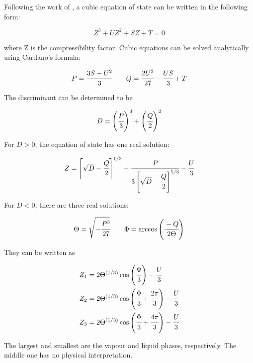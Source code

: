 \documentclass[../Article_Model_Parameters.tex]{subfiles}
\begin{document}
	
	Following the work of \citet{Gmehling2019}, a cubic equation of state can be written in the following form:
	
	{\footnotesize
		\begin{equation}
			Z^3 + UZ^2+ SZ + T = 0
		\end{equation}
	}

	where Z is the compressibility factor. Cubic equations can be solved analytically using Cardano's formula:
	
	{\footnotesize
		\begin{equation*}
			P = \cfrac{3S-U^2}{3} \qquad Q = \cfrac{2U^3}{27}-\cfrac{US}{3} + T
		\end{equation*}
	}

	The discriminant can be determined to be
	
	{\footnotesize
		\begin{equation}
			D = \left( \cfrac{P}{3} \right)^3 + \left( \cfrac{Q}{2} \right)^2
		\end{equation}
	}

	For $D>0$, the equation of state has one real solution:
	
	{\footnotesize
		\begin{equation}
			Z = \left[ \sqrt{D} - \cfrac{Q}{2} \right]^{1/3} - \cfrac{P}{ 3 \left[ \sqrt{D}-\cfrac{Q}{2} \right]^{1/3} } - \cfrac{U}{3}
		\end{equation}
	}

	For $D<0$, there are three real solutions:
	
	{\footnotesize
		\begin{equation*}
			\Theta = \sqrt{-\cfrac{P^3}{27}} \qquad \Phi = \arccos\left( \cfrac{-Q}{2\Theta} \right)
		\end{equation*}
	}

	They can be written as
	
	{\footnotesize
		\begin{align}
			Z_1 &= 2\Theta^{(1/3)} \cos \left( \cfrac{\Phi}{3} \right) - \cfrac{U}{3} \\
			Z_2 &= 2\Theta^{(1/3)} \cos \left( \cfrac{\Phi}{3} + \cfrac{2\pi}{3} \right) - \cfrac{U}{3} \\
			Z_3 &= 2\Theta^{(1/3)} \cos \left( \cfrac{\Phi}{3} + \cfrac{4\pi}{3} \right) - \cfrac{U}{3} 
		\end{align}
	}
	
	The largest and smallest are the vapour and liquid phases, respectively. The middle one has no physical interpretation.
	
\end{document}
